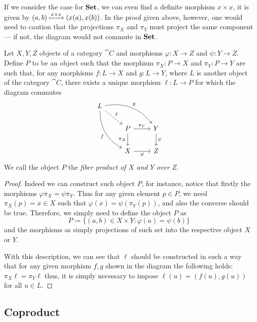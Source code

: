 If we consider the case for \({\textbf{Set}}\), we can even find a definite morphism \(x
\times x\), it is given by \((a, b) \xmapsto{x \times x} (x(a), x(b))\). In the
proof given above, however, one would need to caution that the projections
\(\pi_X\) and \(\pi_Y\) must project the same component --- if not, the diagram
would not commute in \({\textbf{Set}}\).

\begin{proposition}
Let \(X, Y, Z\) objects of a category \(\cat C\) and morphisms \(\varphi :X
\to Z\) and \(\psi : Y \to Z\). Define \(P\) to be an object such that the
morphism  \(\pi_X : P \to X\) and  \(\pi_Y : P \to Y\) are such that, for any
morphisms \(f : L \to X\) and  \(g : L \to Y\), where \(L\) is another object
of the category \(\cat C\), there exists a unique morphism \(\ell: L \to P\)
for which the diagram commutes
\[
  \begin{tikzcd}
    L
    \ar[dr, dashed, "\ell"]
    \ar[drr, bend left, "g"]
    \ar[ddr, bend right, swap, "f"]
    &
      & \\
    &P
    \ar[r, "\pi_Y"]
    \ar[d, swap, "\pi_X"]
      &Y
      \ar[d, "\psi"]
      \\
    &X
    \ar[r, swap, "\varphi"]
      &Z
  \end{tikzcd}
\]
We call the object \(P\) the \emph{fiber product of \(X\) and \(Y\) over
\(Z\)}.
\end{proposition}

\begin{proof}
Indeed we can construct such object \(P\), for instance, notice that firstly
the morphisms \(\varphi  \pi_X = \psi  \pi_Y\). Thus for any
given element \(p \in P\), we need \(\pi_X(p) = x \in X\) such that
\(\varphi(x) = \psi(\pi_Y(p))\), and also the converse should be true.
Therefore, we simply need to define the object \(P\) as
\[
  P \coloneq \{(a, b) \in X \times Y : \varphi(a) = \psi(b)\}
\]
and the morphisms as simply projections of such set into the respective
object \(X\) or \(Y\).

With this description, we can see that \(\ell\) should be constructed in such
a way that for any given morphism \(f, g\) shown in the diagram the following
holds: \(\pi_X  \ell = \pi_Y  \ell\) thus, it is simply necessary
to impose \(\ell(u) = (f(u), g(u))\) for all \(u \in L\).
\end{proof}

\subsection{Coproduct}

